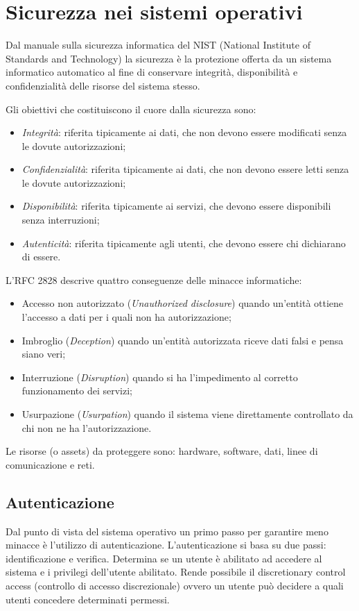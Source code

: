 \chapter{Sicurezza nei sistemi operativi}
Dal manuale sulla sicurezza informatica del NIST (National Institute of Standards and Technology) la sicurezza è la protezione offerta da un sistema informatico automatico al fine di conservare integrità, disponibilità e confidenzialità delle risorse del sistema stesso.

Gli obiettivi che costituiscono il cuore dalla sicurezza sono:
\begin{itemize}
    \item \textit{Integrità}: riferita tipicamente ai dati, che non devono essere modificati senza le dovute autorizzazioni;
    \item \textit{Confidenzialità}: riferita tipicamente ai dati, che non devono essere letti senza le dovute autorizzazioni;
    \item \textit{Disponibilità}: riferita tipicamente ai servizi, che devono essere disponibili senza interruzioni;
    \item \textit{Autenticità}: riferita tipicamente agli utenti, che devono essere chi dichiarano di essere.
\end{itemize}

L'RFC 2828 descrive quattro conseguenze delle minacce informatiche:
\begin{itemize}
    \item Accesso non autorizzato (\textit{Unauthorized disclosure}) quando un'entità ottiene l'accesso a dati per i quali non ha autorizzazione;
    \item Imbroglio (\textit{Deception}) quando un'entità autorizzata riceve dati falsi e pensa siano veri;
    \item Interruzione (\textit{Disruption}) quando si ha l'impedimento al corretto funzionamento dei servizi;
    \item Usurpazione (\textit{Usurpation}) quando il sistema viene direttamente controllato da chi non ne ha l'autorizzazione.
\end{itemize}

Le risorse (o assets) da proteggere sono: hardware, software, dati, linee di comunicazione e reti.

\section{Autenticazione}
Dal punto di vista del sistema operativo un primo passo per garantire meno minacce è l'utilizzo di autenticazione. L'autenticazione si basa su due passi: identificazione e verifica. Determina se un utente è abilitato ad accedere al sistema e i privilegi dell'utente abilitato. Rende possibile il discretionary control access (controllo di
accesso discrezionale) ovvero un utente può decidere a quali utenti concedere determinati
permessi.


